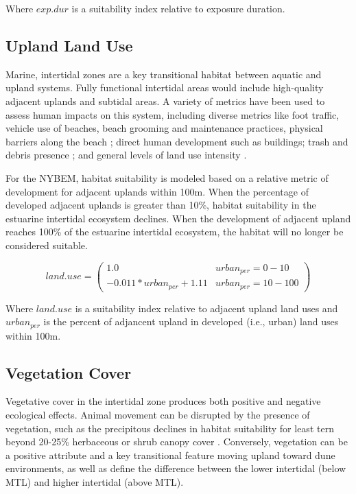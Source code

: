 \documentclass[
]{book}
\begin{document}
Where \(exp.dur\) is a suitability index relative to exposure duration.

\hypertarget{upland-land-use}{%
\subsection{Upland Land Use}\label{upland-land-use}}

Marine, intertidal zones are a key transitional habitat between aquatic and upland systems. Fully functional intertidal areas would include high-quality adjacent uplands and subtidal areas. A variety of metrics have been used to assess human impacts on this system, including diverse metrics like foot traffic, vehicle use of beaches, beach grooming and maintenance practices, physical barriers along the beach \citep{farmer_habitat_2000}; direct human development such as buildings; trash and debris presence \citep{usace_evaluation_2009}; and general levels of land use intensity \citep{seavey_effect_2011}.

For the NYBEM, habitat suitability is modeled based on a relative metric of development for adjacent uplands within 100m. When the percentage of developed adjacent uplands is greater than 10\%, habitat suitability in the estuarine intertidal ecosystem declines. When the development of adjacent upland reaches 100\% of the estuarine intertidal ecosystem, the habitat will no longer be considered suitable.

\[land.use = \begin{pmatrix} 1.0 & urban_{per}=0-10\\
-0.011*urban_{per}+1.11 & urban_{per}=10-100
\end{pmatrix}\]

Where \(land.use\) is a suitability index relative to adjacent upland land uses and \(urban_{per}\) is the percent of adjancent upland in developed (i.e., urban) land uses within 100m.

\hypertarget{vegetation-cover-1}{%
\subsection{Vegetation Cover}\label{vegetation-cover-1}}

Vegetative cover in the intertidal zone produces both positive and negative ecological effects. Animal movement can be disrupted by the presence of vegetation, such as the precipitous declines in habitat suitability for least tern beyond 20-25\% herbaceous or shrub canopy cover \citep{carreker_habitat_1985}. Conversely, vegetation can be a positive attribute and a key transitional feature moving upland toward dune environments, as well as define the difference between the lower intertidal (below MTL) and higher intertidal (above MTL)\citep{usace_evaluation_2009}.
\end{document}
